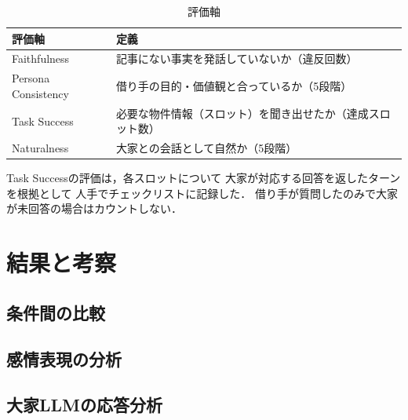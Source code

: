\documentclass{FITpaper}
\begin{document}
\begin{table}[htbp]
  \centering
  \caption{評価軸}
  \label{tbl:rubric}
  \begin{tabular}{l|p{4.5cm}}
    評価軸 & 定義 \\
    \hline
    Faithfulness & 記事にない事実を発話していないか（違反回数） \\
    Persona Consistency & 借り手の目的・価値観と合っているか（5段階） \\
    Task Success & 必要な物件情報（スロット）を聞き出せたか（達成スロット数） \\
    Naturalness & 大家との会話として自然か（5段階） \\
  \end{tabular}
\end{table}

Task Successの評価は，各スロットについて
大家が対応する回答を返したターンを根拠として
人手でチェックリストに記録した．
借り手が質問したのみで大家が未回答の場合はカウントしない．

\section{結果と考察}


\subsection{条件間の比較}


\subsection{感情表現の分析}


\subsection{大家LLMの応答分析}

\end{document}
